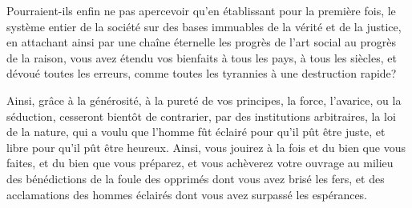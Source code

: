 \begin{displayquote}[p.~27]
  Pourraient-ils enfin ne pas apercevoir qu'en établissant pour la
  première fois, le système entier de la société sur des bases
  immuables de la vérité et de la justice, en attachant ainsi par une
  chaîne éternelle les progrès de l'art social au progrès de la
  raison, vous avez étendu vos bienfaits à tous les pays, à tous les
  siècles, et dévoué toutes les erreurs, comme toutes les tyrannies à
  une destruction rapide?

  Ainsi, grâce à la générosité, à la pureté de vos principes, la
  force, l'avarice, ou la séduction, cesseront bientôt de contrarier,
  par des institutions arbitraires, la loi de la nature, qui a voulu
  que l'homme fût éclairé pour qu'il pût être juste, et libre pour
  qu'il pût être heureux. Ainsi, vous jouirez à la fois et du bien que
  vous faites, et du bien que vous préparez, et vous achèverez votre
  ouvrage au milieu des bénédictions de la foule des opprimés dont
  vous avez brisé les fers, et des acclamations des hommes éclairés
  dont vous avez surpassé les espérances.
\end{displayquote}
%

